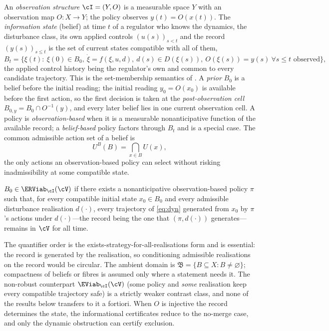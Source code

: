 An \emph{observation structure} $\cI=(Y,O)$ is a measurable space $Y$ with an observation map $O:X\to Y$; the policy observes $y(t)=O(x(t))$. The \emph{information state} (belief) at time $t$ of a regulator who knows the dynamics, the disturbance class, its own applied controls $(u(s))_{s<t}$ and the record $(y(s))_{s\le t}$ is the set of current states compatible with all of them,
\begin{equation}\label{eq:belief}
B_t=\bigl\{\xi(t):\ \xi(0)\in B_0,\ \dot\xi=f(\xi,u,d),\ d(s)\in D(\xi(s)),\ O(\xi(s))=y(s)\ \forall s\le t\text{ observed}\bigr\},
\end{equation}
the applied control history being the regulator's own and common to every candidate trajectory. This is the set-membership semantics of \citet{kurzhanski1997}. A \emph{prior} $B_0$ is a belief before the initial reading; the initial reading $y_0=O(x_0)$ is available before the first action, so the first decision is taken at the \emph{post-observation cell} $B_{0,y}=B_0\cap O^{-1}(y)$, and every later belief lies in one current observation cell. A policy is \emph{observation-based} when it is a measurable nonanticipative function of the available record; a \emph{belief-based} policy factors through $B_t$ and is a special case. The common admissible action set of a belief is
\[
U^B(B)=\bigcap_{x\in B}U(x),
\]
the only actions an observation-based policy can select without risking inadmissibility at some compatible state.

\begin{definition}\label{def:kernel}
$B_0\in\ERViab_\cI(\cV)$ if there exists a nonanticipative observation-based policy $\pi$ such that, for every compatible initial state $x_0\in B_0$ and every admissible disturbance realisation $d(\cdot)$, every trajectory of \eqref{eq:dyn} generated from $x_0$ by $\pi$'s actions under $d(\cdot)$---the record being the one that $(\pi,d(\cdot))$ generates---remains in $\cV$ for all time.
\end{definition}

The quantifier order is the exists-strategy-for-all-realisations form and is essential: the record is generated by the realisation, so conditioning admissible realisations on the record would be circular. The ambient domain is $\mathfrak B=\{B\subseteq X:B\ne\varnothing\}$; compactness of beliefs or fibres is assumed only where a statement needs it. The non-robust counterpart $\EViab_\cI(\cV)$ (some policy and \emph{some} realisation keep every compatible trajectory safe) is a strictly weaker contrast class, and none of the results below transfers to it a fortiori. When $O$ is injective the record determines the state, the informational certificates reduce to the no-merge case, and only the dynamic obstruction can certify exclusion.

